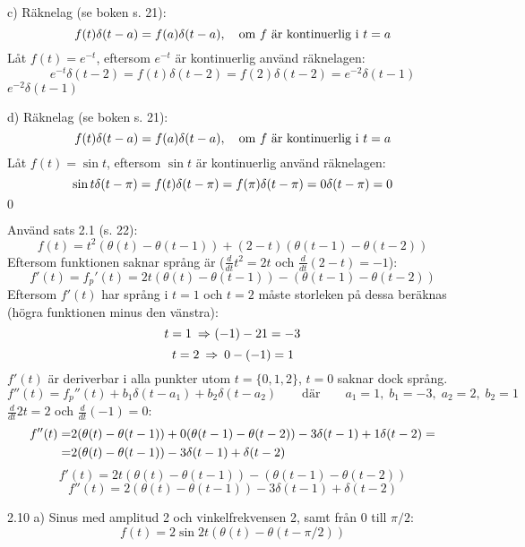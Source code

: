 \begin{task}{c)}
	Räknelag (se boken s. 21):
	\[f(t)\delta(t-a)=f(a)\delta(t-a), \quad \text{om } f \text{ är kontinuerlig i }t=a\]
	Låt $f(t)=e^{-t}$, eftersom $e^{-t}$ är kontinuerlig använd räknelagen:
	\[e^{-t}\delta(t-2)=
	f(t)\delta(t-2)=
	f(2)\delta(t-2)=
	e^{-2}\delta(t-1)\]
	\ans $e^{-2}\delta(t-1)$
\end{task}

\begin{task}{d)}
	Räknelag (se boken s. 21):
	\[f(t)\delta(t-a)=f(a)\delta(t-a), \quad \text{om } f \text{ är kontinuerlig i }t=a\]
	Låt $f(t)=\sin t$, eftersom $\sin t$ är kontinuerlig använd räknelagen:
	\[\sin t\delta(t-\pi)=
	f(t)\delta(t-\pi)=
	f(\pi)\delta(t-\pi)=
	0\*\delta(t-\pi)=
	0\]
	\ans $0$
\end{task}

\begin{task}{2.9}
	Använd sats 2.1 (s. 22):
	\[f(t)= t^2(\theta(t)-\theta(t-1))+(2-t)(\theta(t-1)-\theta(t-2))\]
	Eftersom funktionen saknar språng är ($\frac{d}{dt}t^2=2t$ och $\frac{d}{dt}(2-t)=-1$):
	\[f'(t)=f_p'(t)=2t(\theta(t)-\theta(t-1))-(\theta(t-1)-\theta(t-2))\]
	Eftersom $f'(t)$ har språng i $t=1$ och $t=2$ måste storleken på dessa beräknas (högra funktionen minus den vänstra):
	\[t=1 \ra (-1)-2\*1=-3\]
	\[t=2 \ra 0-(-1)=1\]
	$f'(t)$ är deriverbar i alla punkter utom $t=\{0,1,2\}$, $t=0$ saknar dock språng.
	\[f''(t)=f_p''(t)+b_1\delta(t-a_1)+b_2\delta(t-a_2) \qquad\text{där}\qquad a_1=1,\;b_1=-3,\;a_2=2,\;b_2=1\]
	$\frac{d}{dt}2t=2$ och $\frac{d}{dt}(-1)=0$:
	\begin{align*}
	f''(t)=
	&2(\theta(t)-\theta(t-1))+0\*(\theta(t-1)-\theta(t-2))-3\delta(t-1)+1\*\delta(t-2)= \\ =
	&2(\theta(t)-\theta(t-1))-3\delta(t-1)+\delta(t-2)
	\end{align*}
	\ans 
	\[f'(t)=2t(\theta(t)-\theta(t-1))-(\theta(t-1)-\theta(t-2))\]
	\[f''(t)=2(\theta(t)-\theta(t-1))-3\delta(t-1)+\delta(t-2)\]
\end{task}

\begin{task}{2.10 a)}
	Sinus med amplitud 2 och vinkelfrekvensen 2, samt från 0 till $\pi/2$:
	\[f(t)=2\sin 2t(\theta(t)-\theta(t-\pi/2))\]
\end{task}

